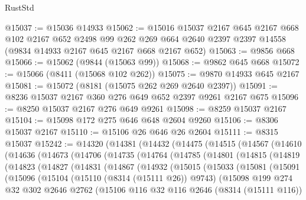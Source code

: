 \begin{lexlean}{RustStd}
\begin{coremodule}
@15037 := @15036 @14933
@15062 := @15016
    @15037
    @2167
    @645
    @2167
    @668
    @102
    @2167
    @652
    @2498
    @99
    @262
    @269
    @664
    @2640
    @2397
    @2397
    @14558
    (@9834 @14933 @2167 @645 @2167 @668 @2167 @652)
@15063 := @9856 @668
@15066 := @15062 (@9844 (@15063 @99))
@15068 := @9862 @645 @668
@15072 := @15066 (@8411 (@15068 @102 @262))
@15075 := @9870 @14933 @645 @2167
@15081 := @15072 (@8181 (@15075 @262 @269 @2640 @2397))
@15091 := @8236 @15037 @2167 @360 @276 @649 @652 @2397 @9261 @2167 @675
@15096 := @8250 @15037 @2167 @276 @649 @9261
@15098 := @8259 @15037 @2167
@15104 := @15098 @172 @275 @646 @648 @2604 @9260
@15106 := @8306 @15037 @2167
@15110 := @15106 @26 @646 @26 @2604
@15111 := @8315 @15037
@15242 := @14320
    (@14381
      (@14432
        (@14475
          (@14515
            (@14567
              (@14610
                (@14636
                  (@14673
                    (@14706
                      (@14735
                        (@14764
                          (@14785
                            (@14801
                              (@14815
                                (@14819
                                  (@14823
                                    (@14827
                                      (@14831
                                        (@14867
                                          (@14932
                                            (@15015
                                              (@15033
                                                (@15081
                                                  (@15091
                                                    (@15096
                                                      (@15104
                                                        (@15110 (@8314 (@15111 @26)) @9743)
                                                        (@15098
                                                          @199
                                                          @274
                                                          @32
                                                          @302
                                                          @2646
                                                          @2762
                                                          (@15106
                                                            @116
                                                            @32
                                                            @116
                                                            @2646
                                                            (@8314 (@15111 @116))

\end{coremodule}
\end{lexlean}
